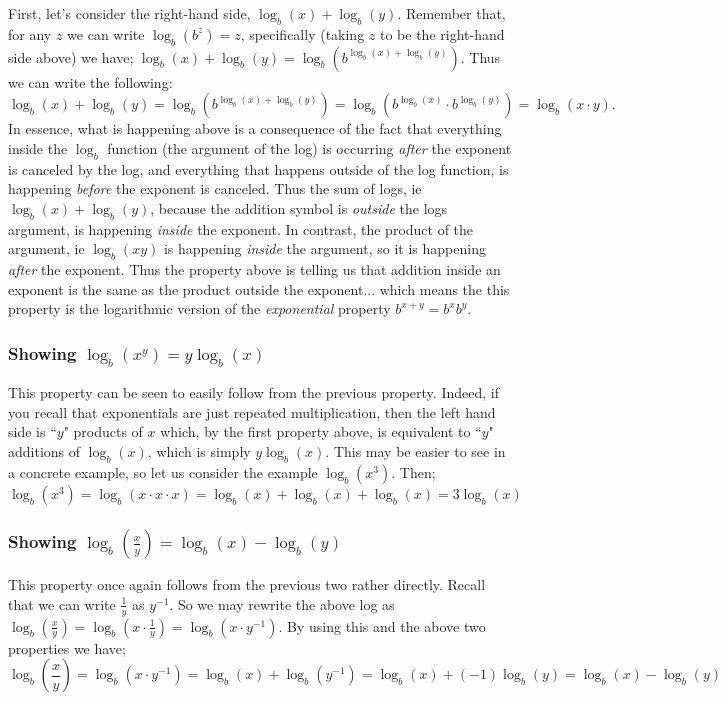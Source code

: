 \documentclass{ximera}
\begin{document}
        First, let's consider the right-hand side, $\log_b(x) + \log_b(y)$. Remember that, for any $z$ we can write $\log_b(b^z) = z$, specifically (taking $z$ to be the right-hand side above) we have; $\log_b(x) + \log_b(y) = \log_b\left( b^{\log_b(x) + \log_b(y)} \right)$. Thus we can write the following:
        \[
            \log_b(x) + \log_b(y)   = \log_b\left( b^{\log_b(x) + \log_b(y)} \right) 
                                    = \log_b\left( b^{\log_b(x)}\cdot b^{\log_b(y)}\right) 
                                    = \log_b(x \cdot y).
        \]
        In essence, what is happening above is a consequence of the fact that everything inside the $\log_b$ function (the argument of the log) is occurring \textit{after} the exponent is canceled by the log, and everything that happens outside of the log function, is happening \textit{before} the exponent is canceled. Thus the sum of logs, ie $\log_b(x) + \log_b(y)$, because the addition symbol is \textit{outside} the logs argument, is happening \textit{inside} the exponent. In contrast, the product of the argument, ie $\log_b(xy)$ is happening \textit{inside} the argument, so it is happening \textit{after} the exponent. Thus the property above is telling us that addition inside an exponent is the same as the product outside the exponent... which means the this property is the logarithmic version of the \textit{exponential} property $b^{x+y} = b^xb^y$.
        
    \subsubsection*{Showing $\log_b(x^y) = y\log_b(x)$}
        This property can be seen to easily follow from the previous property. Indeed, if you recall that exponentials are just repeated multiplication, then the left hand side is ``$y$" products of $x$ which, by the first property above, is equivalent to ``$y$" additions of $\log_b(x)$, which is simply $y\log_b(x)$. This may be easier to see in a concrete example, so let us consider the example $\log_b (x^3)$. Then;
        \[
            \log_b(x^3) = \log_b(x\cdot x\cdot x) = \log_b(x) + \log_b(x) + \log_b(x) = 3\log_b(x)
        \]
    
    \subsubsection*{Showing $\log_b\left(\frac{x}{y}\right) = \log_b(x) - \log_b(y)$}
        This property once again follows from the previous two rather directly. Recall that we can write $\frac{1}{y}$ as $y^{-1}$. So we may rewrite the above log as $\log_b\left(\frac{x}{y}\right) = \log_b\left(x \cdot \frac{1}{y}\right) = \log_b\left(x\cdot y^{-1}\right)$. By using this and the above two properties we have;
        \[
            \log_b\left(\frac{x}{y}\right)  = \log_b\left(x\cdot y^{-1}\right) 
                                            = \log_b(x) + \log_b\left(y^{-1}\right) 
                                            = \log_b(x) + (-1)\log_b(y)
                                            = \log_b(x) - \log_b(y) 
        \]
        
\end{document}
